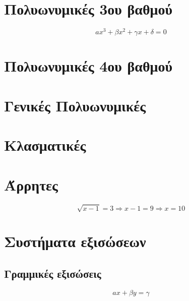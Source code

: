 \documentclass[a4paper,twoside,11pt]{book}
\begin{document}
\section{Πολυωνυμικές 3ου βαθμού}
\[ ax^3+\beta x^2+\gamma x+\delta=0 \]

\section{Πολυωνυμικές 4ου βαθμού}
\section{Γενικές Πολυωνυμικές}
\section{Κλασματικές}
\section{Άρρητες}
\[ \sqrt{x-1}=3\Rightarrow x-1=9\Rightarrow x=10 \]
\section{Συστήματα εξισώσεων}
\subsection{Γραμμικές εξισώσεις}
\[ ax+\beta y=\gamma \]
\end{document}
